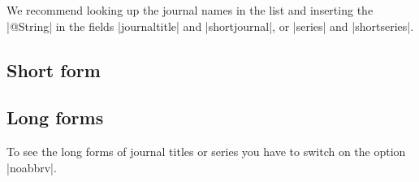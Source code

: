 \documentclass[a4paper,
10pt,
greek,
french,
spanish,
italian,
ngerman,
english,
]{ltxdoc}
\begin{document}
We recommend  looking up the journal names in the list and inserting the |@String| in the fields  |journaltitle| and |shortjournal|, or |series| and |shortseries|.


\subsection{Short form} \label{liste-kurz}
\begin{multicols}{2}

\end{multicols}


\subsection{Long forms}\label{liste-lang}
To see the long forms of journal titles or series you have to switch on the option  |noabbrv|.



\end{document}
